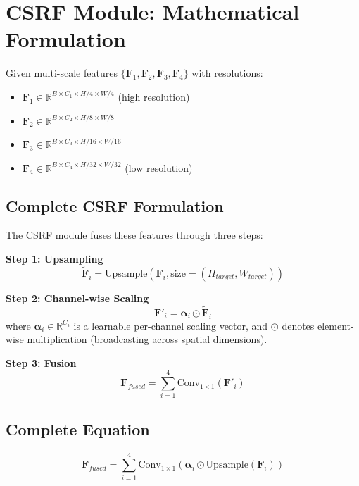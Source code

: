 
\section{CSRF Module: Mathematical Formulation}

Given multi-scale features $\{\mathbf{F}_1, \mathbf{F}_2, \mathbf{F}_3, \mathbf{F}_4\}$ with resolutions:
\begin{itemize}
    \item $\mathbf{F}_1 \in \mathbb{R}^{B \times C_1 \times H/4 \times W/4}$ (high resolution)
    \item $\mathbf{F}_2 \in \mathbb{R}^{B \times C_2 \times H/8 \times W/8}$
    \item $\mathbf{F}_3 \in \mathbb{R}^{B \times C_3 \times H/16 \times W/16}$
    \item $\mathbf{F}_4 \in \mathbb{R}^{B \times C_4 \times H/32 \times W/32}$ (low resolution)
\end{itemize}

\subsection{Complete CSRF Formulation}

The CSRF module fuses these features through three steps:

\textbf{Step 1: Upsampling}
\begin{equation}
\tilde{\mathbf{F}}_i = \text{Upsample}(\mathbf{F}_i, \text{size}=(H_{target}, W_{target}))
\end{equation}

\textbf{Step 2: Channel-wise Scaling}
\begin{equation}
\mathbf{F}'_i = \boldsymbol{\alpha}_i \odot \tilde{\mathbf{F}}_i
\end{equation}
where $\boldsymbol{\alpha}_i \in \mathbb{R}^{C_i}$ is a learnable per-channel scaling vector, and $\odot$ denotes element-wise multiplication (broadcasting across spatial dimensions).

\textbf{Step 3: Fusion}
\begin{equation}
\mathbf{F}_{fused} = \sum_{i=1}^{4} \text{Conv}_{1\times1}(\mathbf{F}'_i)
\end{equation}

\subsection{Complete Equation}

\begin{equation}
\boxed{
\mathbf{F}_{fused} = \sum_{i=1}^{4} \text{Conv}_{1\times1}\left(\boldsymbol{\alpha}_i \odot \text{Upsample}(\mathbf{F}_i)\right)
}
\end{equation}


